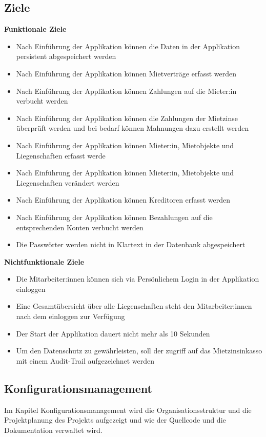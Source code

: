 \subsection{Ziele}
\textbf{Funktionale Ziele}
\begin{itemize}
  \item Nach Einführung der Applikation können die Daten in der Applikation persistent abgespeichert werden
  \item Nach Einführung der Applikation können Mietverträge erfasst werden
  \item Nach Einführung der Applikation können Zahlungen auf die Mieter:in verbucht werden
  \item Nach Einführung der Applikation können die Zahlungen der Mietzinse überprüft werden und bei bedarf können Mahnungen dazu erstellt werden
  \item Nach Einführung der Applikation können Mieter:in, Mietobjekte und Liegenschaften erfasst werde
  \item Nach Einführung der Applikation können Mieter:in, Mietobjekte und Liegenschaften verändert werden
  \item Nach Einführung der Applikation können Kreditoren erfasst werden
  \item Nach Einführung der Applikation können Bezahlungen auf die entsprechenden Konten verbucht werden
  \item Die Passwörter werden nicht in Klartext in der Datenbank abgespeichert
\end{itemize}

\textbf{Nichtfunktionale Ziele}
\begin{itemize}
  \item Die Mitarbeiter:innen können sich via Persönlichem Login in der Applikation einloggen
  \item Eine Gesamtübersicht über alle Liegenschaften steht den Mitarbeiter:innen nach dem einloggen zur Verfügung
  \item Der Start der Applikation dauert nicht mehr als 10 Sekunden
  \item Um den Datenschutz zu gewährleisten, soll der zugriff auf das Mietzinsinkasso mit einem Audit-Trail aufgezeichnet werden
\end{itemize}


\subsection{Konfigurationsmanagement}
Im Kapitel Konfigurationsmanagement wird die Organisationsstruktur und die Projektplanung des Projekts aufgezeigt und wie der Quellcode und die Dokumentation verwaltet wird.

